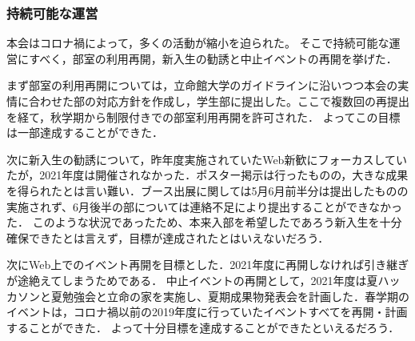 \subsubsection*{持続可能な運営}
    本会はコロナ禍によって，多くの活動が縮小を迫られた。
    そこで持続可能な運営にすべく，部室の利用再開，新入生の勧誘と中止イベントの再開を挙げた．
    
    まず部室の利用再開については，立命館大学のガイドラインに沿いつつ本会の実情に合わせた部の対応方針を作成し，学生部に提出した。ここで複数回の再提出を経て，秋学期から制限付きでの部室利用再開を許可された．
    よってこの目標は一部達成することができた．
    
    次に新入生の勧誘について，昨年度実施されていたWeb新歓にフォーカスしていたが，2021年度は開催されなかった．ポスター掲示は行ったものの，大きな成果を得られたとは言い難い．ブース出展に関しては5月6月前半分は提出したものの実施されず、6月後半の部については連絡不足により提出することができなかった．
    このような状況であったため、本来入部を希望したであろう新入生を十分確保できたとは言えず，目標が達成されたとはいえないだろう．
    
    次にWeb上でのイベント再開を目標とした．2021年度に再開しなければ引き継ぎが途絶えてしまうためである．
    中止イベントの再開として，2021年度は夏ハッカソンと夏勉強会と立命の家を実施し、夏期成果物発表会を計画した．春学期のイベントは，コロナ禍以前の2019年度に行っていたイベントすべてを再開・計画することができた．
    よって十分目標を達成することができたといえるだろう．